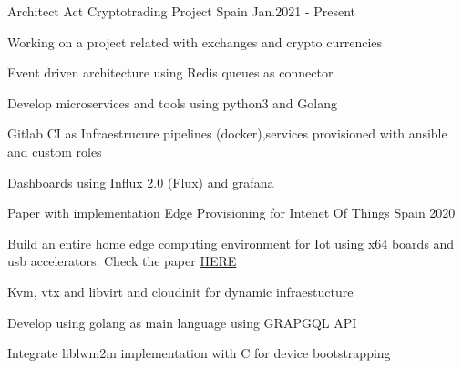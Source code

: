 

\begin{cventries}

  \cventry
    {Architect} %
    {Act Cryptotrading Project} %
    {Spain} %
    {Jan.2021 - Present} %
    {
      \begin{cvitems} %
        \item {Working on a project related with exchanges and crypto currencies}
        \item {Event driven architecture using Redis queues as connector}
        \item {Develop microservices and tools using python3 and Golang}
        \item {Gitlab CI as Infraestrucure pipelines (docker),services provisioned with ansible and custom roles}
        \item {Dashboards using Influx 2.0 (Flux) and grafana}
      \end{cvitems}
    }

  \cventry
    {Paper with implementation} %
    {Edge Provisioning for Intenet Of Things} %
    {Spain} %
    {2020} %
    {
      \begin{cvitems} %
        \item {Build an entire home edge computing environment for Iot using x64 boards and usb accelerators. Check the paper \href{https://eprints.ucm.es/id/eprint/62175/}{HERE}}
        \item {Kvm, vtx and libvirt and cloudinit for dynamic infraestucture}
        \item {Develop using golang as main language using GRAPGQL API}
        \item {Integrate liblwm2m implementation with C for device bootstrapping}
      \end{cvitems}
    }


\end{cventries}
